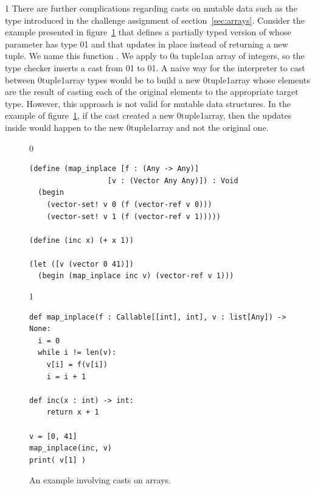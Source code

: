 \documentclass[7x10]{TimesAPriori_MIT}%
\def\racketEd{0}
\def\pythonEd{1}
\def\edition{1}
\newcommand{\racket}[1]{{\if\edition\racketEd{#1}\fi}}
\newcommand{\pythonColor}[0]{}
\newcommand{\python}[1]{{\if\edition\pythonEd\pythonColor #1\fi}}
\numberwithin{theorem}{chapter}
\numberwithin{definition}{chapter}
\numberwithin{equation}{chapter}
\begin{document}
{\if\edition\pythonEd\pythonColor
%
There are further complications regarding casts on mutable data
such as the  type introduced in
the challenge assignment of section~\ref{sec:arrays}.
%
\fi}
%
Consider the example presented in figure~\ref{fig:map-bang} that
defines a partially typed version of  whose parameter
 has type
\racket{}\python{}
and that updates  in place
instead of returning a new tuple. We name this function
. We apply  to
\racket{a tuple}\python{an array} of integers, so the type checker
inserts a cast from
\racket{}\python{}
to
\racket{}\python{}.
A naive way for the \LangCast{} interpreter to cast between
\racket{tuple}\python{array} types would be to build a new
\racket{tuple}\python{array} whose elements are the result
of casting each of the original elements to the appropriate target
type. However, this approach is not valid for mutable data structures.
In the example of figure~\ref{fig:map-bang},
if the cast created a new \racket{tuple}\python{array}, then the updates inside
 would happen to the new \racket{tuple}\python{array} and not
the original one.

\begin{figure}[tbp]
  \begin{tcolorbox}[colback=white]
{\if\edition\racketEd
\begin{lstlisting}
(define (map_inplace [f : (Any -> Any)]
                  [v : (Vector Any Any)]) : Void
  (begin
    (vector-set! v 0 (f (vector-ref v 0)))
    (vector-set! v 1 (f (vector-ref v 1)))))

(define (inc x) (+ x 1))

(let ([v (vector 0 41)])
  (begin (map_inplace inc v) (vector-ref v 1)))
\end{lstlisting}
\fi}
{\if\edition\pythonEd\pythonColor
\begin{lstlisting}
def map_inplace(f : Callable[[int], int], v : list[Any]) -> None:
  i = 0
  while i != len(v):
    v[i] = f(v[i])
    i = i + 1

def inc(x : int) -> int:
    return x + 1

v = [0, 41]
map_inplace(inc, v)
print( v[1] )
\end{lstlisting}
\fi}
  \end{tcolorbox}

  \caption{An example involving casts on arrays.}
\label{fig:map-bang}
\end{figure}
\end{document}
